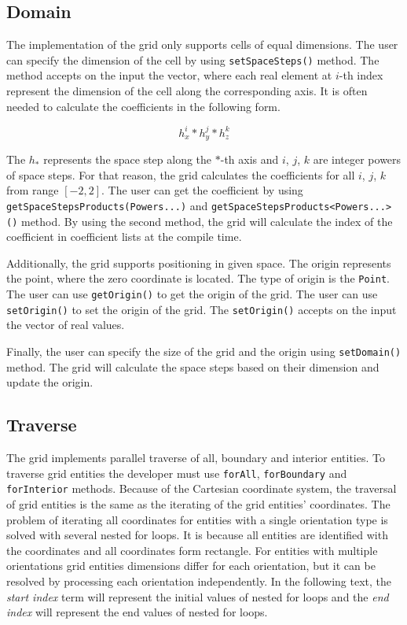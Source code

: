\subsection{Domain}

The implementation of the grid only supports cells of equal dimensions.
The user can specify the dimension of the cell by using \texttt{setSpaceSteps()} method.
The method accepts on the input the vector, where each real element at \(i\)-th index represent the dimension of the cell along the corresponding axis.
It is often needed to calculate the coefficients in the following form.

\begin{equation}
 h_x^i * h_y^j * h_z^k
\end{equation}

The \(h_{*}\) represents the space step along the \(*\)-th axis and \(i\), \(j\), \(k\) are integer powers of space steps.
For that reason, the grid calculates the coefficients for all \(i\), \(j\), \(k\) from range \([-2, 2]\).
The user can get the coefficient by using \texttt{getSpaceStepsProducts(Powers...)} and \texttt{getSpaceStepsProducts<Powers...>()} method.
By using the second method, the grid will calculate the index of the coefficient in coefficient lists at the compile time.

Additionally, the grid supports positioning in given space.
The origin represents the point, where the zero coordinate is located.
The type of origin is the \texttt{Point}.
The user can use \texttt{getOrigin()} to get the origin of the grid.
The user can use \texttt{setOrigin()} to set the origin of the grid.
The \texttt{setOrigin()} accepts on the input the vector of real values.

Finally, the user can specify the size of the grid and the origin using \texttt{setDomain()} method.
The grid will calculate the space steps based on their dimension and update the origin.

\subsection{Traverse}

The grid implements parallel traverse of all, boundary and interior entities.
To traverse grid entities the developer must use \texttt{forAll}, \texttt{forBoundary} and \texttt{forInterior} methods.
Because of the Cartesian coordinate system, the traversal of grid entities is the same as the iterating of the grid entities' coordinates.
The problem of iterating all coordinates for entities with a single orientation type is solved with several nested for loops.
It is because all entities are identified with the coordinates and all coordinates form rectangle.
For entities with multiple orientations grid entities dimensions differ for each orientation, but it can be resolved by processing each orientation independently.
In the following text, the \textit{start index} term will represent the initial values of nested for loops and the \textit {end index} will represent the end values of nested for loops.

